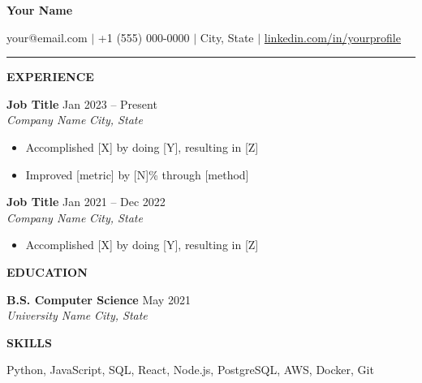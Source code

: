 \documentclass[10pt,a4paper]{article}
\newcommand{\entry}[4]{%
  \textbf{#1} \hfill #2 \\
  \textit{#3} \hfill \textit{#4}
}
\begin{document}
{\Large \textbf{Your Name}}

\vspace{2pt}
your@email.com $|$ +1 (555) 000-0000 $|$ City, State $|$
\href{https://linkedin.com/in/yourprofile}{linkedin.com/in/yourprofile}

\noindent\rule{\textwidth}{0.4pt}

\vspace{6pt}
\textbf{EXPERIENCE}

\vspace{4pt}
\entry{Job Title}{Jan 2023 -- Present}{Company Name}{City, State}
\begin{itemize}[leftmargin=1.5em, noitemsep, topsep=3pt, parsep=0pt]
  \item Accomplished [X] by doing [Y], resulting in [Z]
  \item Improved [metric] by [N]\% through [method]
\end{itemize}

\vspace{4pt}
\entry{Job Title}{Jan 2021 -- Dec 2022}{Company Name}{City, State}
\begin{itemize}[leftmargin=1.5em, noitemsep, topsep=3pt, parsep=0pt]
  \item Accomplished [X] by doing [Y], resulting in [Z]
\end{itemize}

\vspace{6pt}
\textbf{EDUCATION}

\vspace{4pt}
\entry{B.S. Computer Science}{May 2021}{University Name}{City, State}

\vspace{6pt}
\textbf{SKILLS}

\vspace{4pt}
Python, JavaScript, SQL, React, Node.js, PostgreSQL, AWS, Docker, Git
\end{document}
